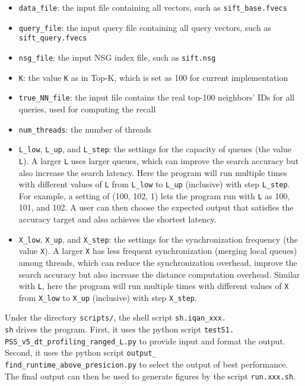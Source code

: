 \begin{itemize}[leftmargin=0.1in]
    \item \verb|data_file|: the input file containing all vectors, such as \verb|sift_base.fvecs|
    \item \verb|query_file|: the input query file containing all query vectors, such as \verb|sift_query.fvecs|
    \item \verb|nsg_file|: the input NSG index file, such as \verb|sift.nsg|
    \item \verb|K|: the value \verb|K| as in Top-K, which is set as 100 for current implementation
    \item \verb|true_NN_file|: the input file contains the real top-100 neighbors' IDs for all queries, used for computing the recall
    \item \verb|num_threads|: the number of threads
    \item \verb|L_low|, \verb|L_up|, and \verb|L_step|: the settings for the capacity of queues (the value \verb|L|). A larger \verb|L| uses larger queues, which can improve the search accuracy but also increase the search latency. Here the program will run multiple times with different values of \verb|L| from \verb|L_low| to \verb|L_up| (inclusive) with step \verb|L_step|. For example, a setting of (100, 102, 1) lets the program run with \verb|L| as 100, 101, and 102. A user can then choose the expected output that satisfies the accuracy target and also achieves the shortest latency.
    \item \verb|X_low|, \verb|X_up|, and \verb|X_step|: the settings for the synchronization frequency (the value \verb|X|). A larger \verb|X| has less frequent synchronization (merging local queues) among threads, which can reduce the synchronization overhead, improve the search accuracy but also increase the distance computation overhead. Similar with \verb|L|, here the program will run multiple times with different values of \verb|X| from \verb|X_low| to \verb|X_up| (inclusive) with step \verb|X_step|.
    
\end{itemize}
Under the directory \verb|scripts/|, the shell script \verb|sh.iqan_xxx.|\\
\verb|sh| drives the program. First, it uses the python script \verb|test51.|\\
\verb|PSS_v5_dt_profiling_ranged_L.py| to provide input and format the output. Second, it uses the python script \verb|output_|\\
\verb|find_runtime_above_presicion.py| to select the output of best performance. The final output can then be used to generate figures by the script \verb|run.xxx.sh|.


%    
%